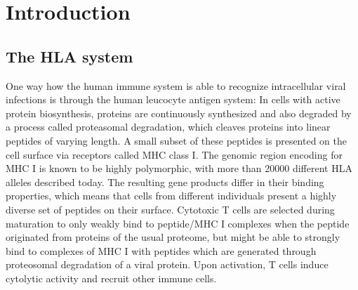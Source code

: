\documentclass[fleqn,11pt]{SelfArx} %
\affiliation{\textsuperscript{1}\textit{Bioinformatics \& Computational Biophysics, Faculty of Biology, University of Duisburg-Essen, 45117 Essen, Germany}} %
\begin{document}
\flushbottom %

\maketitle %

{
  \hypersetup{linkcolor=black}
  \tableofcontents
}

\pagebreak

\section{Introduction}



\subsection{The HLA system}

One way how the human immune system is able to recognize intracellular viral infections
is through the human leucocyte antigen system:
In cells with active protein biosynthesis, proteins are continuously synthesized
and also degraded by a process called proteasomal degradation, which cleaves
proteins into linear peptides of varying length.
A small subset of these peptides is presented on the cell surface via
receptors called MHC class I. The genomic region encoding for MHC I is known to be
highly polymorphic, with more than 20000 different HLA alleles described today.
The resulting gene products differ in their binding properties, which means that
cells from different individuals present a highly diverse set of peptides on their
surface.
Cytotoxic T cells are selected during maturation to only weakly bind to 
peptide/MHC I complexes when the peptide originated from proteins of the usual proteome, 
but might be able to strongly bind to complexes of MHC I with peptides which are 
generated through proteosomal degradation of a viral protein.
Upon activation, T cells induce cytolytic activity and recruit other immune cells.
\end{document}
